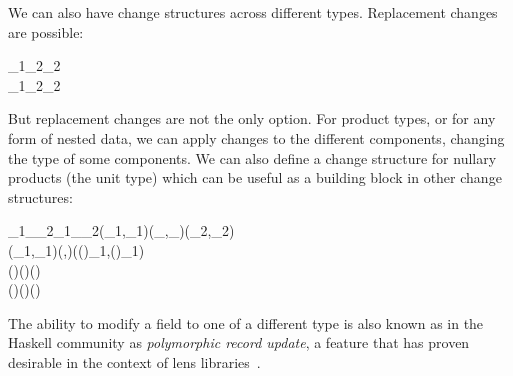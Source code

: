 We can also have change structures across different types.
Replacement changes are possible:
\begin{hscode}\SaveRestoreHook
{}%
%
\>[B]{}\mathrel{:\mkern-1mu:}\;\tau_{1}\;\tau_{2}\;\tau_{2}{}\<[E]%
\\
\>[B]{}\mathrel{=}\mathrel{\$}\lambda {}_{1}\;_{2}\to {}_{2}{}\<[E]%
\ColumnHook
\end{hscode}\resethooks
But replacement changes are not the only option. For product types, or for any
form of nested data, we can apply changes to
the different components, changing the type of some components. We can also
define a change structure for nullary products (the unit type) which can be
useful as a building block in other change structures:%
\begin{hscode}\SaveRestoreHook
{}%
%
\>[B]{}\mathrel{:\mkern-1mu:}\;\sigma_{1}\;\delta_\sigma\;\sigma_{2}\to {}\;\tau_{1}\;\delta_\tau\;\tau_{2}\to {}\;(\sigma_{1},\tau_{1})\;(\delta_\sigma,\delta_\tau)\;(\sigma_{2},\tau_{2}){}\<[E]%
\\
\>[B]{}\;\;\mathrel{=}\mathrel{\$}\lambda (_{1},_{1})\;(,)\to ((\myboxplus)\;\;_{1}\;,(\myboxplus)\;\;_{1}\;){}\<[E]%
\\
\>[B]{}\mathrel{:\mkern-1mu:}\;()\;()\;(){}\<[E]%
\\
\>[B]{}\mathrel{=}\mathrel{\$}\lambda ()\;()\to (){}\<[E]%
\ColumnHook
\end{hscode}\resethooks
The ability to modify a field to one of a different type is also known as
in the Haskell community as \emph{polymorphic record update}, a feature that has
proven desirable in the context of lens
libraries~\citep{OConnor2012polymorphic,Kmett2012mirrored}.

